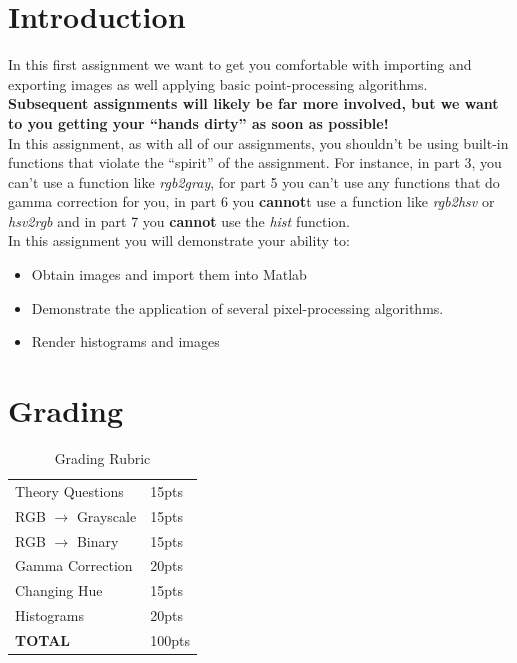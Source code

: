 \documentclass[12pt]{article}
\begin{document}
\maketitle


\section*{Introduction}
In this first assignment we want to get you comfortable with importing and exporting images as well applying basic point-processing algorithms.   \\

\noindent
\textbf{Subsequent assignments will likely be far more involved, but we want to you getting your “hands dirty” as soon as possible!}\\

\noindent
In this assignment, as with all of our assignments, you shouldn't be using built-in functions that violate the ``spirit'' of the assignment.  For instance, in part 3, you can't use a function like \emph{rgb2gray}, for part 5 you can't use any functions that do gamma correction for you, in part 6 you \textbf{cannot}t use a function like \emph{rgb2hsv} or \emph{hsv2rgb} and in part 7 you \textbf{cannot} use the \emph{hist} function.\\

\noindent
In this assignment you will demonstrate your ability to:
\begin{itemize}
\item Obtain images and import them into Matlab
\item Demonstrate the application of several pixel-processing algorithms.
\item Render histograms and images
\end{itemize}

\section*{Grading}
\begin{table}[h]
\begin{centering}
\begin{tabular}{|l|l|}
\hline
Theory Questions & 15pts \\
RGB $\rightarrow$ Grayscale & 15pts\\
RGB $\rightarrow$ Binary & 15pts\\
Gamma Correction & 20pts\\
Changing Hue & 15pts\\
Histograms & 20pts\\
\hline
\textbf{TOTAL} & 100pts\\
\hline
\end{tabular}
\caption{Grading Rubric}
\end{centering}
\end{table}
\end{document}
